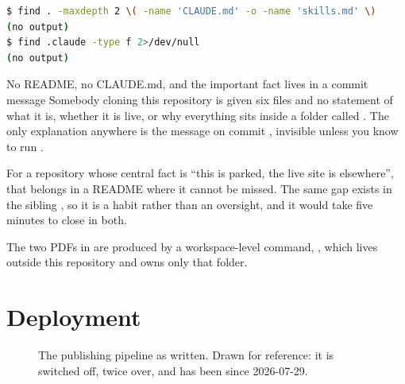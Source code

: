 \documentclass[11pt,a4paper]{article}
\begin{document}
\begin{lstlisting}[language=bash,caption={The check, and its result}]
$ find . -maxdepth 2 \( -name 'CLAUDE.md' -o -name 'skills.md' \)
(no output)
$ find .claude -type f 2>/dev/null
(no output)
\end{lstlisting}

\begin{honest}{No README, no CLAUDE.md, and the important fact lives in a commit
message}
Somebody cloning this repository is given six files and no statement of what it is,
whether it is live, or why everything sits inside a folder called
. The only explanation anywhere is the message on commit
, invisible unless you know to run .

For a repository whose central fact is ``this is parked, the live site is
elsewhere'', that belongs in a README where it cannot be missed. The same gap
exists in the sibling , so it is a habit rather than an
oversight, and it would take five minutes to close in both.
\end{honest}

The two PDFs in  are produced by a workspace-level command,
, which lives outside this repository and owns only that
folder.

\section{Deployment}

\begin{figure}[H]\centering
{}
\caption{The publishing pipeline as written. Drawn for reference: it is switched
off, twice over, and has been since 2026-07-29.}
\end{figure}
\end{document}
